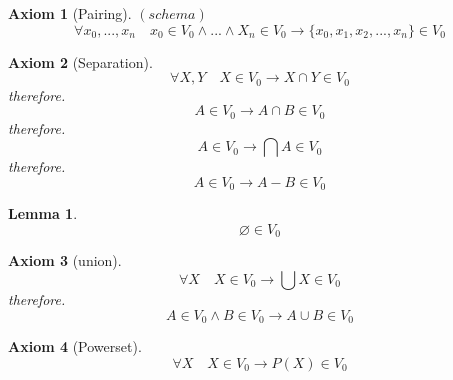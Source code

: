 \documentclass[10pt,a4paper]{book}
\let\emptyset\varnothing
\newtheorem{lemma}{Lemma}[section]
\newtheorem{axiom}{Axiom}[section]
\begin{document}



\begin{axiom}
    [Pairing]  $(schema)$
    \[ \forall x_0,...,x_n \quad x_0 \in V_0 \land ... \land X_n \in V_0 \to \{x_{0}, x_{1}, x_{2}, ... ,x_{n} \} \in V_0 \]
\end{axiom}


\begin{axiom}
    [Separation]
    \[ \forall X,Y \quad  X \in V_0 \to X \cap Y  \in V_0 \]
    therefore.
    \[ A \in V_0  \to  A \cap B \in V_0  \]
    therefore.
    \[  A \in V_0  \to  \bigcap A \in V_0  \]
    therefore.
    \[ A \in V_0  \to  A - B \in V_0  \]
\end{axiom}


\begin{lemma}
    \[  \emptyset \in V_0  \]
\end{lemma}

\begin{axiom}
    [union]
    \[ \forall X \quad  X \in V_0 \to \bigcup X \in V_0 \]
    therefore.
    \[ A \in V_0 \land  B \in V_0  \to  A \cup B \in V_0 \]
\end{axiom}


\begin{axiom}
    [Powerset]
    \[ \forall X \quad  X \in V_0 \to P(X) \in V_0 \]
\end{axiom}
\end{document}
